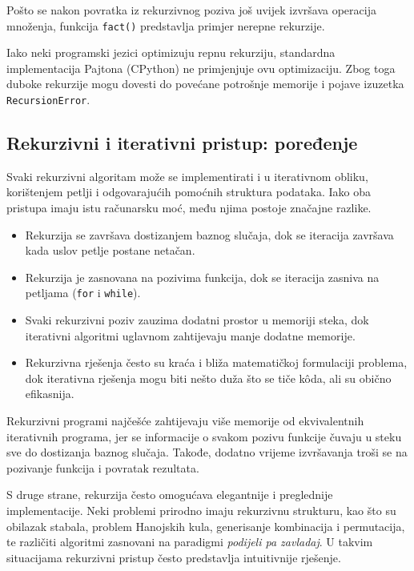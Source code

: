 Pošto se nakon povratka iz rekurzivnog poziva još uvijek izvršava operacija množenja, funkcija \texttt{fact()} predstavlja primjer nerepne rekurzije.

Iako neki programski jezici optimizuju repnu rekurziju, standardna implementacija Pajtona (CPython) ne primjenjuje ovu optimizaciju. Zbog toga duboke rekurzije mogu dovesti do povećane potrošnje memorije i pojave izuzetka \texttt{RecursionError}.

 
\subsection{Rekurzivni i iterativni pristup: poređenje}

Svaki rekurzivni algoritam može se implementirati i u iterativnom obliku, korištenjem petlji i odgovarajućih pomoćnih struktura podataka. Iako oba pristupa imaju istu računarsku moć, među njima postoje značajne razlike.

\begin{itemize}
	\item Rekurzija se završava dostizanjem baznog slučaja, dok se iteracija završava kada uslov petlje postane netačan.
	
	\item Rekurzija je zasnovana na pozivima funkcija, dok se iteracija zasniva na petljama (\texttt{for} i \texttt{while}).
	
	\item Svaki rekurzivni poziv zauzima dodatni prostor u memoriji steka, dok iterativni algoritmi uglavnom zahtijevaju manje dodatne memorije.
	
	\item Rekurzivna rješenja često su kraća i bliža matematičkoj formulaciji problema, dok iterativna rješenja mogu biti nešto duža što se tiče k\^oda, ali su obično efikasnija.	
\end{itemize}

Rekurzivni programi najčešće zahtijevaju više memorije od ekvivalentnih iterativnih programa, jer se informacije o svakom pozivu funkcije čuvaju u steku sve do dostizanja baznog slučaja. Takođe, dodatno vrijeme izvršavanja troši se na pozivanje funkcija i povratak rezultata.

S druge strane, rekurzija često omogućava elegantnije i preglednije implementacije. Neki problemi prirodno imaju rekurzivnu strukturu, kao što su obilazak stabala, problem Hanojskih kula, generisanje kombinacija i permutacija, te različiti algoritmi zasnovani na paradigmi \emph{podijeli pa zavladaj}. U takvim situacijama rekurzivni pristup često predstavlja intuitivnije rješenje.

